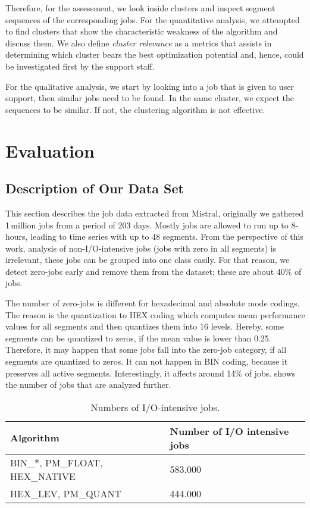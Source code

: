 \documentclass{jhps}
\begin{document}
Therefore, for the assessment, we look inside clusters and inspect segment sequences of the corresponding jobs.
For the quantitative analysis, we attempted to find clusters that show the characteristic weakness of the algorithm and discuss them.
We also define \textit{cluster relevance} as a metrics that assists in determining which cluster bears the best optimization potential and, hence, could be investigated first by the support staff.

For the qualitative analysis, we start by looking into a job that is given to user support, then similar jobs need to be found.
In the same cluster, we expect the sequences to be similar.
If not, the clustering algorithm is not effective.


\section{Evaluation}

\subsection{Description of Our Data Set}

This section describes the job data extracted from Mistral, originally we gathered 1\,million jobs from a period of 203 days.
Mostly jobs are allowed to run up to 8-hours, leading to time series with up to 48 segments.
From the perspective of this work, analysis of non-I/O-intensive jobs (jobs with zero in all segments) is irrelevant, these jobs can be grouped into one class easily.
For that reason, we detect zero-jobs early and remove them from the dataset; these are about 40\% of jobs.

The number of zero-jobs is different for hexadecimal and absolute mode codings.
The reason is the quantization to HEX coding which computes mean performance values for all segments and then quantizes them into 16 levels.
Hereby, some segments can be quantized to zeros, if the mean value is lower than 0.25.
Therefore, it may happen that some jobs fall into the zero-job category, if all segments are quantized to zeros.
It can not happen in BIN coding, because it preserves all active segments.
Interestingly, it affects around 14$\%$ of jobs.
 shows the number of jobs that are analyzed further.

\begin{table}
  \centering
  \begin{tabular}{ll}
    Algorithm & Number of I/O intensive jobs \\
    \hline
    BIN\_$\ast$, PM\_FLOAT, HEX\_NATIVE &  583.000 \\
    HEX\_LEV, PM\_QUANT &  444.000 \\
  \end{tabular}
  \caption{Numbers of I/O-intensive jobs.}
  \label{tab:n_intensive_jobs}
\end{table}
\end{document}
